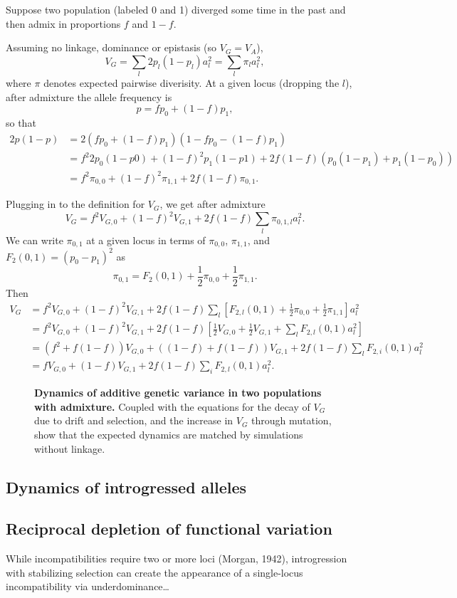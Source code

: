 \documentclass{article}
\begin{document}
Suppose two population (labeled 0 and 1) diverged some time in the past and
then admix in proportions $f$ and $1-f$.

Assuming no linkage, dominance or epistasis (so \(V_G=V_A\)),
\[V_G = \sum_l 2p_l(1-p_l)a_l^2 = \sum_l \pi_l a_l^2,\]
where $\pi$ denotes expected pairwise diverisity.
At a given locus (dropping the $l$), after admixture the allele frequency is
\[p=f p_0 + (1-f) p_1,\]
so that
\begin{align*}
    2p(1-p) & = 2(f p_0 + (1-f) p_1)(1 - f p_0 - (1-f) p_1) \\
    & = f^2 2p_0(1-p0) + (1-f)^2 p_1(1-p1) + 2f(1-f) (p_0(1-p_1) + p_1(1-p_0)) \\
    & = f^2 \pi_{0,0} + (1-f)^2 \pi_{1,1} + 2f(1-f)\pi_{0,1}.
\end{align*}

Plugging in to the definition for $V_G$, we get after admixture
\[V_G = f^2 V_{G,0} + (1-f)^2 V_{G,1} + 2f(1-f)\sum_l \pi_{0,1,l}a_l^2.\]
We can write $\pi_{0,1}$ at a given locus in terms of $\pi_{0,0}$, $\pi_{1,1}$,
and $F_2(0,1)=(p_0-p_1)^2$ as \citep{peter2016admixture}
\[\pi_{0,1} = F_2(0,1) + \frac{1}{2}\pi_{0,0} + \frac{1}{2}\pi_{1,1}.\]
Then
\begin{align*}
    V_G & = f^2 V_{G,0} + (1-f)^2 V_{G,1} + 2f(1-f)\sum_l \left[F_{2,l}(0,1)
    + \frac{1}{2}\pi_{0,0} + \frac{1}{2}\pi_{1,1}\right] a_l^2 \\
    & = f^2 V_{G,0} + (1-f)^2 V_{G,1} + 2f(1-f)\left[\frac{1}{2}V_{G,0} 
    + \frac{1}{2}V_{G,1} + \sum_l F_{2,l}(0,1)a_l^2\right] \\
    & = \left(f^2 + f(1-f)\right) V_{G,0} + \left((1-f) + f(1-f)\right)V_{G,1}
    + 2f(1-f) \sum_l F_{2,i}(0,1)a_l^2 \\
    & = f V_{G,0} + (1-f)V_{G,1} + 2f(1-f)\sum_i F_{2,l}(0,1)a_l^2.
\end{align*}


\begin{figure}[tb!]
    \centering
    \caption{
        \textbf{Dynamics of additive genetic variance in two populations with admixture.}
        Coupled with the equations for the decay of $V_G$ due to drift and selection,
        and the increase in $V_G$ through mutation, show that the expected dynamics
        are matched by simulations without linkage.
    }
    \label{fig:VG_dynamics}
\end{figure}

\subsection{Dynamics of introgressed alleles}

\subsection{Reciprocal depletion of functional variation}

While incompatibilities require two or more loci (Morgan, 1942), introgression
with stabilizing selection can create the appearance of a single-locus
incompatibility via underdominance\dots
\end{document}
